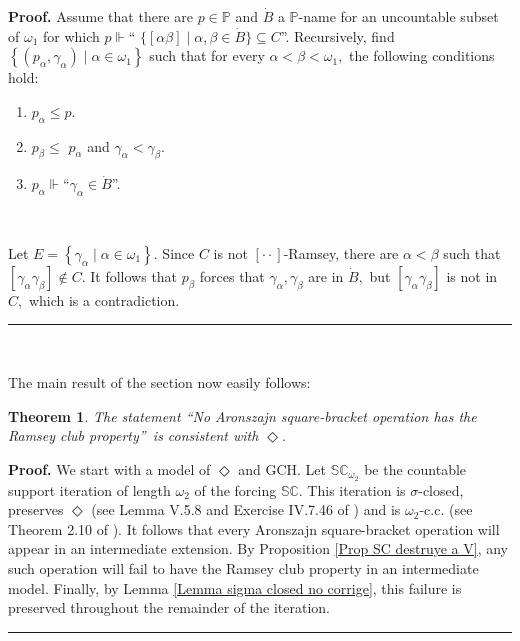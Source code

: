 \documentclass{article}
\newtheorem{theorem}{Theorem}
\newenvironment{proof}[1][Proof]{\noindent\textbf{#1.} }{\ \rule{0.5em}{0.5em}}
\begin{document}
\begin{proof}
Assume that there are $p\in\mathbb{P}$ and $\dot{B}$ a $\mathbb{P}$-name for
an uncountable subset of $\omega_{1}$ for which $p\Vdash$\textquotedblleft%
$\{\left[  \alpha\beta\right]  \mid\alpha,\beta\in\dot{B}\}\subseteq
C$\textquotedblright. Recursively, find $\left\{  \left(  p_{\alpha}%
,\gamma_{\alpha}\right)  \mid\alpha\in\omega_{1}\right\}  $ such that for
every $\alpha<\beta<\omega_{1},$ the following conditions hold:

\begin{enumerate}
\item $p_{\alpha}\leq p.$

\item $p_{\beta}\leq$ $p_{\alpha}$ and $\gamma_{\alpha}<\gamma_{\beta}.$

\item $p_{\alpha}\Vdash$\textquotedblleft$\gamma_{\alpha}\in\dot{B}%
$\textquotedblright.
\end{enumerate}

\qquad\ \ \ \qquad\ \ \ 

Let $E=\left\{  \gamma_{\alpha}\mid\alpha\in\omega_{1}\right\}  .$ Since $C$
is not $[\cdot\cdot]$-Ramsey, there are $\alpha<\beta$ such that $\left[
\gamma_{\alpha}\gamma_{\beta}\right]  \notin C.$ It follows that $p_{\beta}$
forces that $\gamma_{\alpha},\gamma_{\beta}$ are in $\dot{B},$ but $\left[
\gamma_{\alpha}\gamma_{\beta}\right]  $ is not in $C,$ which is a contradiction.
\end{proof}

\qquad\ \qquad\ \ \ \ \ 

The main result of the section now easily follows:

\begin{theorem}
The statement \textquotedblleft No Aronszajn square-bracket operation has the
Ramsey club property\textquotedblright\ is consistent with $\mathsf{\Diamond
.}$
\end{theorem}

\begin{proof}
We start with a model of $\Diamond$ and \textsf{GCH. }Let $\mathbb{SC}%
_{\omega_{2}}$ be the countable support iteration of length $\omega_{2}$ of
the forcing $\mathbb{SC}.$ This iteration is $\sigma$-closed, preserves
$\Diamond$ (see Lemma V.5.8 and Exercise IV.7.46 of \cite{Kunen}) and is
$\omega_{2}$\textsf{-c.c.} (see Theorem 2.10 of \cite{AbrahamHandbook}). It
follows that every Aronszajn square-bracket operation will appear in an
intermediate extension. By Proposition \ref{Prop SC destruye a V}, any such
operation will fail to have the Ramsey club property in an intermediate model.
Finally, by Lemma \ref{Lemma sigma closed no corrige}, this failure is
preserved throughout the remainder of the iteration.
\end{proof}
\end{document}
